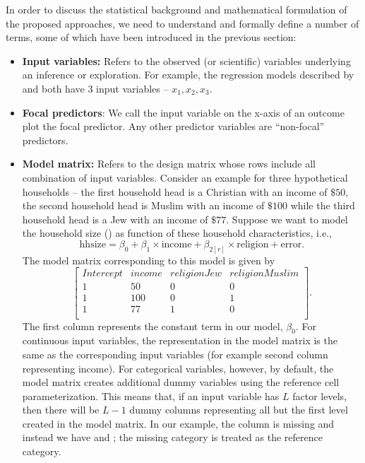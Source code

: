 In order to discuss the statistical background and mathematical formulation of the proposed approaches, we need to understand and formally define a number of terms, some of which have been introduced in the previous section:


\begin{itemize}
\item \textbf{Input variables:} Refers to the observed (or scientific) variables underlying an inference or exploration. For example, the regression models described by  and  both have $3$ input variables -- $x_1, x_2, x_3$.
\item \textbf{Focal predictors}: We call the input variable on the x-axis of an outcome plot the focal predictor.  Any other predictor variables are ``non-focal'' predictors. 

\item \textbf{Model matrix:} Refers to the design matrix whose rows include all combination of input variables. Consider an example for three hypothetical households -- the first household head is a Christian with an income of $\$ 50$, the second household head is Muslim with an income of $\$ 100$ while the third household head is a Jew with an income of $\$ 77$. Suppose we want to model the household size () as function of these household characteristics, i.e., $$\mathrm{hhsize} = \beta_0 + \beta_1\times\mathrm{income} + \beta_{2[r]}\times\mathrm{religion} + \mathrm{error}.$$ The model matrix corresponding to this model is given by
$$\begin{bmatrix}{}
 Intercept & income & religionJew & religionMuslim \\
 1 & 50 & 0 & 0 \\
  1 & 100 & 0 & 1 \\
  1 & 77 & 1 & 0 \\
\end{bmatrix}.$$ The first column represents the constant term in our model, $\beta_0$. For continuous input variables, the representation in the model matrix is the same as the corresponding input variables (for example second column representing income). For categorical variables, however, by default, the model matrix  creates additional dummy variables using the reference cell parameterization. This means that, if an input variable has $L$ factor levels, then there will be $L-1$ dummy columns representing all but the first level created in the model matrix. In our example, the column  is missing and instead we have  and ; the missing category  is treated as the reference category.


\end{itemize}
